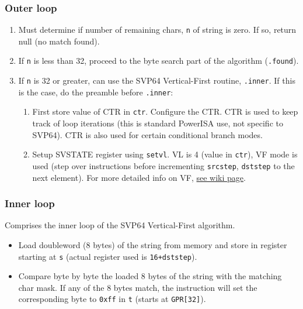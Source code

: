 \subsubsection{Outer loop}

\begin{enumerate}
  \item Must determine if number of remaining chars, \texttt{n} of
  string is zero. If so, return null (no match found).
  \item If \texttt{n} is less than 32, proceed to the byte search part of
  the algorithm (\texttt{.found}).
  \item If \texttt{n} is 32 or greater, can use the SVP64 Vertical-First
  routine, \texttt{.inner}. If this is the case, do the preamble
  before \texttt{.inner}:
  \begin{enumerate}
    \item First store value of \acrshort{CTR} in \texttt{ctr}.
    Configure the \acrshort{CTR}. \acrshort{CTR} is used to keep
    track of loop iterations (this is standard PowerISA use,
    not specific to SVP64). \acrshort{CTR} is also used for
    certain conditional branch modes.
    \item Setup \acrshort{SVSTATE} register using \texttt{setvl}.
    \acrfull{VL} is 4 (value in \texttt{ctr}), \acrfull{VF} mode is used
    (step over instructions before
    incrementing \texttt{srcstep}, \texttt{dststep} to the next element).
    For more detailed info on \acrshort{VF},
    \href{https://libre-soc.org/openpower/sv/svstep/}{see wiki page}.
  \end{enumerate}
\end{enumerate}

\subsubsection{Inner loop}

Comprises the inner loop of the SVP64 Vertical-First algorithm.

\begin{itemize}
  \item Load doubleword (8 bytes) of the string from memory and store in 
register starting at \texttt{s} (actual register used is \texttt{16+dststep}).
  \item Compare byte by byte the loaded 8 bytes of the string with the matching
char mask. If any of the 8 bytes match, the instruction will set
the corresponding byte to \texttt{0xff} in \texttt{t}
(starts at \texttt{GPR[32]}).
\end{itemize}

